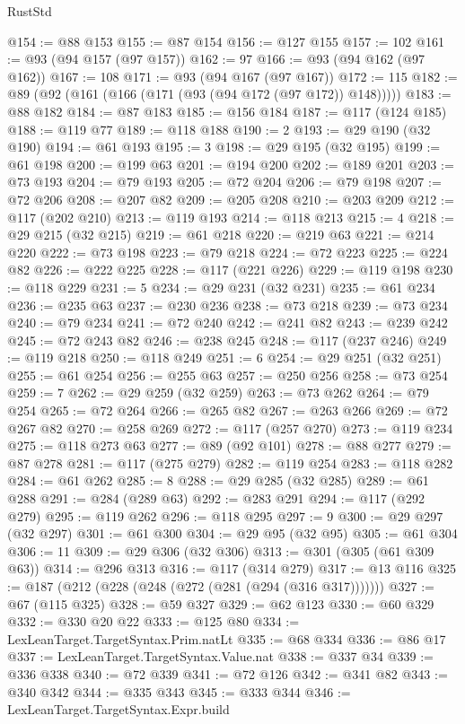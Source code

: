 \begin{lexlean}{RustStd}
\begin{coremodule}
@154 := @88 @153
@155 := @87 @154
@156 := @127 @155
@157 := 102
@161 := @93 (@94 @157 (@97 @157))
@162 := 97
@166 := @93 (@94 @162 (@97 @162))
@167 := 108
@171 := @93 (@94 @167 (@97 @167))
@172 := 115
@182 := @89 (@92 (@161 (@166 (@171 (@93 (@94 @172 (@97 @172)) @148)))))
@183 := @88 @182
@184 := @87 @183
@185 := @156 @184
@187 := @117 (@124 @185)
@188 := @119 @77
@189 := @118 @188
@190 := 2
@193 := @29 @190 (@32 @190)
@194 := @61 @193
@195 := 3
@198 := @29 @195 (@32 @195)
@199 := @61 @198
@200 := @199 @63
@201 := @194 @200
@202 := @189 @201
@203 := @73 @193
@204 := @79 @193
@205 := @72 @204
@206 := @79 @198
@207 := @72 @206
@208 := @207 @82
@209 := @205 @208
@210 := @203 @209
@212 := @117 (@202 @210)
@213 := @119 @193
@214 := @118 @213
@215 := 4
@218 := @29 @215 (@32 @215)
@219 := @61 @218
@220 := @219 @63
@221 := @214 @220
@222 := @73 @198
@223 := @79 @218
@224 := @72 @223
@225 := @224 @82
@226 := @222 @225
@228 := @117 (@221 @226)
@229 := @119 @198
@230 := @118 @229
@231 := 5
@234 := @29 @231 (@32 @231)
@235 := @61 @234
@236 := @235 @63
@237 := @230 @236
@238 := @73 @218
@239 := @73 @234
@240 := @79 @234
@241 := @72 @240
@242 := @241 @82
@243 := @239 @242
@245 := @72 @243 @82
@246 := @238 @245
@248 := @117 (@237 @246)
@249 := @119 @218
@250 := @118 @249
@251 := 6
@254 := @29 @251 (@32 @251)
@255 := @61 @254
@256 := @255 @63
@257 := @250 @256
@258 := @73 @254
@259 := 7
@262 := @29 @259 (@32 @259)
@263 := @73 @262
@264 := @79 @254
@265 := @72 @264
@266 := @265 @82
@267 := @263 @266
@269 := @72 @267 @82
@270 := @258 @269
@272 := @117 (@257 @270)
@273 := @119 @234
@275 := @118 @273 @63
@277 := @89 (@92 @101)
@278 := @88 @277
@279 := @87 @278
@281 := @117 (@275 @279)
@282 := @119 @254
@283 := @118 @282
@284 := @61 @262
@285 := 8
@288 := @29 @285 (@32 @285)
@289 := @61 @288
@291 := @284 (@289 @63)
@292 := @283 @291
@294 := @117 (@292 @279)
@295 := @119 @262
@296 := @118 @295
@297 := 9
@300 := @29 @297 (@32 @297)
@301 := @61 @300
@304 := @29 @95 (@32 @95)
@305 := @61 @304
@306 := 11
@309 := @29 @306 (@32 @306)
@313 := @301 (@305 (@61 @309 @63))
@314 := @296 @313
@316 := @117 (@314 @279)
@317 := @13 @116
@325 := @187 (@212 (@228 (@248 (@272 (@281 (@294 (@316 @317)))))))
@327 := @67 (@115 @325)
@328 := @59 @327
@329 := @62 @123
@330 := @60 @329
@332 := @330 @20 @22
@333 := @125 @80
@334 := LexLeanTarget.TargetSyntax.Prim.natLt
@335 := @68 @334
@336 := @86 @17
@337 := LexLeanTarget.TargetSyntax.Value.nat
@338 := @337 @34
@339 := @336 @338
@340 := @72 @339
@341 := @72 @126
@342 := @341 @82
@343 := @340 @342
@344 := @335 @343
@345 := @333 @344
@346 := LexLeanTarget.TargetSyntax.Expr.build

\end{coremodule}
\end{lexlean}
